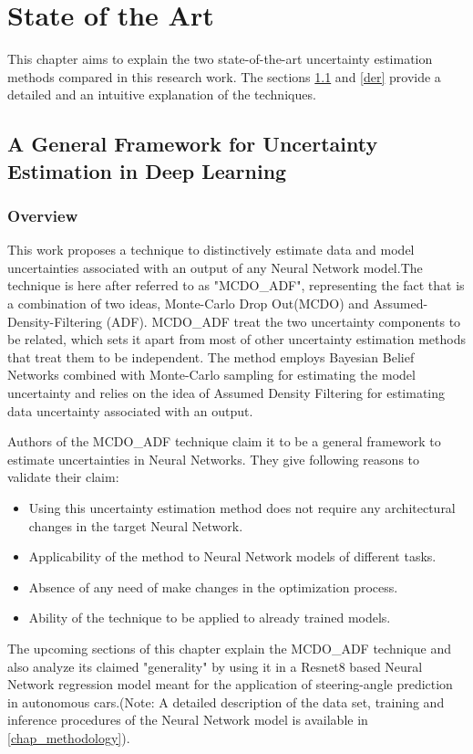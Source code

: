 

    \chapter{State of the Art}
	This chapter aims to explain the two state-of-the-art uncertainty estimation methods compared in this research work. The sections \ref{general_framework} and \ref{der} provide a detailed and an intuitive explanation of the techniques.
	
	\section{A General Framework for Uncertainty Estimation in Deep Learning}\label{general_framework}
	\subsection{Overview}\label{mcdo_adf_overview}
	This work proposes a technique to distinctively estimate data and model uncertainties associated with an output of any Neural Network model.The technique is here after referred to as "MCDO\_ADF", representing the fact that is a combination of two ideas, Monte-Carlo Drop Out(MCDO) and Assumed-Density-Filtering (ADF). MCDO\_ADF treat the  two uncertainty components to be related, which sets it apart from most of other uncertainty estimation methods that treat them to be independent. The method employs Bayesian Belief Networks combined with Monte-Carlo sampling for estimating the model uncertainty and relies on the idea of Assumed Density Filtering for  estimating data uncertainty associated with an output. 
	
	Authors of the MCDO\_ADF technique claim it to be a general framework to estimate uncertainties in Neural Networks. They give following reasons to validate their claim:
	\begin{itemize}
		\item Using this uncertainty estimation method does not require any architectural changes in the target Neural Network.
		\item Applicability of the method to Neural Network models of different tasks.
		\item Absence of any need of make changes in the optimization process.
		\item Ability of the technique to be applied to already trained models.
	\end{itemize}
	
	The upcoming sections of this chapter explain the MCDO\_ADF technique  and also analyze its claimed "generality" by using it in a Resnet8 based Neural Network regression model meant for the application of steering-angle prediction in autonomous cars.(Note: A detailed description of the data set, training and inference procedures of the Neural Network model is available in \ref{chap_methodology}).  
	
